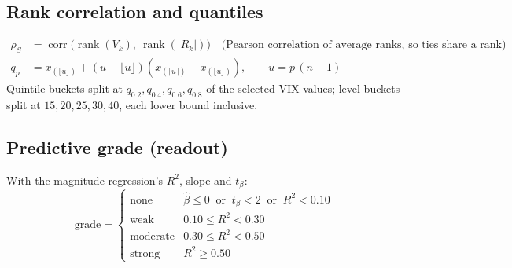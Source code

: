 \documentclass[11pt]{article}
\begin{document}
\subsection*{Rank correlation and quantiles}
\begin{align*}
\rho_S &= \operatorname{corr}\big(\operatorname{rank}(V_k),\ \operatorname{rank}(|R_k|)\big) \quad \text{(Pearson correlation of average ranks, so ties share a rank)}\\
q_p &= x_{(\lfloor u \rfloor)} + (u - \lfloor u \rfloor)\left(x_{(\lceil u \rceil)} - x_{(\lfloor u \rfloor)}\right), \qquad u = p\,(n-1)
\end{align*}
Quintile buckets split at $q_{0.2}, q_{0.4}, q_{0.6}, q_{0.8}$ of the selected VIX values; level buckets split at $15, 20, 25, 30, 40$, each lower bound inclusive.

\subsection*{Predictive grade (readout)}
With the magnitude regression's $R^2$, slope and $t_\beta$:
\[
\text{grade} =
\begin{cases}
\text{none} & \hat\beta \le 0 \ \text{ or } \ t_\beta < 2 \ \text{ or } \ R^2 < 0.10\\
\text{weak} & 0.10 \le R^2 < 0.30\\
\text{moderate} & 0.30 \le R^2 < 0.50\\
\text{strong} & R^2 \ge 0.50
\end{cases}
\]
\end{document}
